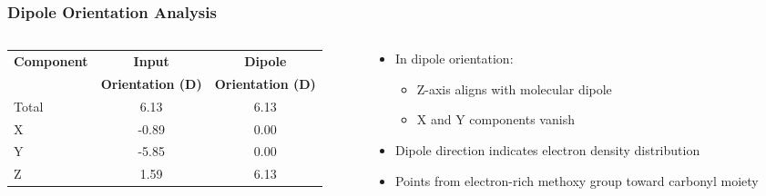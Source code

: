 \documentclass[aspectratio=169, 9pt]{beamer}
\begin{document}
\begin{frame}
\frametitle{Dipole Orientation Analysis}
\begin{columns}
\begin{column}{0.55\textwidth}
\centering
\begin{tabular}{|l|c|c|}
\hline
\textbf{Component} & \textbf{Input} & \textbf{Dipole} \\
\textbf{} & \textbf{Orientation (D)} & \textbf{Orientation (D)} \\
\hline
Total & 6.13 & 6.13 \\
\hline
X & -0.89 & 0.00 \\
\hline
Y & -5.85 & 0.00 \\
\hline
Z & 1.59 & 6.13 \\
\hline
\end{tabular}
\end{column}
\begin{column}{0.45\textwidth}
\begin{itemize}
\item In dipole orientation:
  \begin{itemize}
  \item Z-axis aligns with molecular dipole
  \item X and Y components vanish
  \end{itemize}
\item Dipole direction indicates electron density distribution
\item Points from electron-rich methoxy group toward carbonyl moiety
\end{itemize}
\end{column}
\end{columns}
\end{frame}
\end{document}
